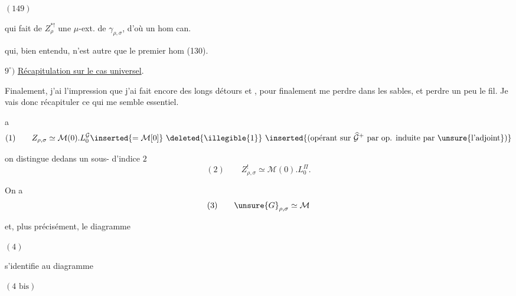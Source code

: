 \( (149) \)\quad
{}

qui fait de $Z_\rho^{*!}$ une $\mu$-ext. de $\gamma_{\rho,\sigma}$,
d'où un hom can.


qui, bien entendu, n'est autre que le premier hom (130).

$9^\circ)$ \uline{Récapitulation sur le cas universel}.

Finalement, j'ai l'impression que j'ai fait encore des longs détours et
, pour finalement me perdre dans les sables, et perdre un
peu le fil. Je vais donc récapituler ce qui me semble essentiel.

\textcircled{a}
\[
(1)\qquad Z_{\rho,\sigma}\simeq\mathcal M(0).L_0^{\mathcal G}
\inserted{=\mathcal M[0]}\ \deleted{\illegible{1}}\ \inserted{
\text{(opérant sur }\widehat{\mathcal G}^{+}\text{ par op. induite par }\unsure{\text{l'adjoint}}\text{)}}
\]

on distingue dedans un sous- d'indice $2$
\[
(2)\qquad Z_{\rho,\sigma}^{!}\simeq\mathcal M(0).L_0^{\Pi}.
\]


On a
\[
(3)\qquad \unsure{G}_{\rho,\sigma}\simeq\mathcal M
\]

et,  plus précisément, le diagramme

\( (4) \)\quad
{}

s'identifie au diagramme

\( (4\text{ bis}) \)\quad
{}


